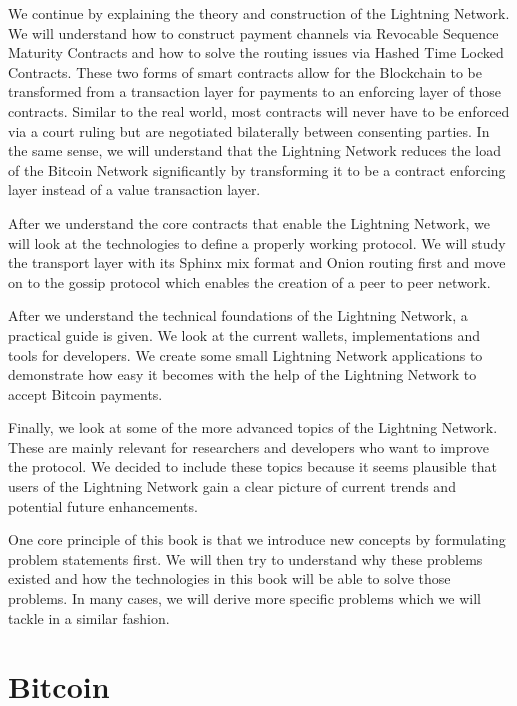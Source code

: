 \documentclass[ebook,12pt,oneside,openany]{memoir}
\begin{document}
We continue by explaining the theory and construction of the Lightning Network.
We will understand how to construct payment channels via Revocable Sequence Maturity Contracts and how to solve the routing issues via Hashed Time Locked Contracts.
These two forms of smart contracts allow for the Blockchain to be transformed from a transaction layer for payments to an enforcing layer of those contracts.
Similar to the real world, most contracts will never have to be enforced via a court ruling but are negotiated bilaterally between consenting parties.
In the same sense, we will understand that the Lightning Network reduces the load of the Bitcoin Network significantly by transforming it to be a contract enforcing layer instead of a value transaction layer.

After we understand the core contracts that enable the Lightning Network, we will look at the technologies to define a properly working protocol.
We will study the transport layer with its Sphinx mix format and Onion routing first and move on to the gossip protocol which enables the creation of a peer to peer network.

After we understand the technical foundations of the Lightning Network, a practical guide is given.
We look at the current wallets, implementations and tools for developers.
We create some small Lightning Network applications to demonstrate how easy it becomes with the help of the Lightning Network to accept Bitcoin payments.

Finally, we look at some of the more advanced topics of the Lightning Network.
These are mainly relevant for researchers and developers who want to improve the protocol.
We decided to include these topics because it seems plausible that users of the Lightning Network gain a clear picture of current trends and potential future enhancements. 

One core principle of this book is that we introduce new concepts by formulating problem statements first. We will then try to understand why these problems existed and how the technologies in this book will be able to solve those problems. In many cases, we will derive more specific problems which we will tackle in a similar fashion.

\chapter{Bitcoin}
\end{document}
